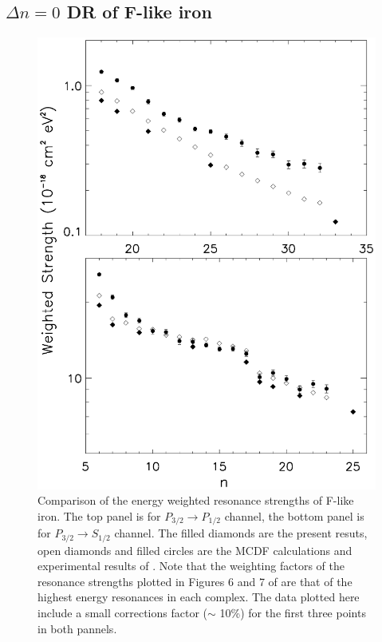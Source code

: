 \documentclass[preprint, floatfix, pra, showpacs, showkeys]{revtex4}
\begin{document}
\subsection{$\Delta n = 0$ DR of F-like iron}
\begin{figure}
\includegraphics[width=5in]{str.eps}
\caption{\label{fig_str} Comparison of the energy weighted resonance
strengths of F-like iron. The top panel is for $P_{3/2}\to P_{1/2}$ channel,
the bottom 
panel is for $P_{3/2}\to S_{1/2}$ channel. The filled diamonds are the present
resuts, open diamonds and filled circles are the MCDF calculations and
experimental results of \textcite{savin99}. Note that the weighting factors of
the resonance strengths plotted in Figures 6 and 7 of \textcite{savin99} are that
of the highest energy resonances in each complex. The data plotted here
include a small corrections factor ($\sim$ 10\%) for the first three points in
both pannels.}
\end{figure}
\end{document}
